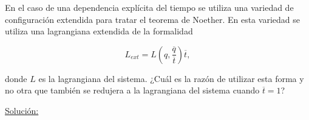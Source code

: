 \documentclass[a4paper,10pt]{article}
\numberwithin{equation}{section}
\begin{document}
En el caso de una dependencia explícita del tiempo se utiliza una variedad de configuración 
extendida para tratar el teorema de Noether. En esta variedad se utiliza una lagrangiana 
extendida de la formalidad

$$
L_{ext} = L(q,\frac{\overline{q}}{\overline{t}})\overline{t},
$$

donde $L$ es la lagrangiana del sistema. ¿Cuál es la razón de utilizar esta forma y no 
otra que también se redujera a la lagrangiana del sistema cuando $\overline{t}=1$?

\vspace{.3cm}

\underline{Solución:} \vspace{.3cm}
\end{document}
